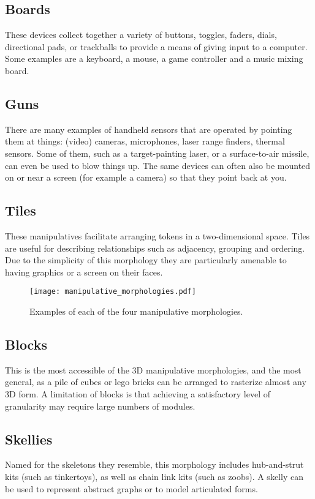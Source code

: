 \subsection{Boards}
%
These devices collect together a variety of buttons, toggles, faders, dials, directional pads, or trackballs to provide a means of giving input to a computer. Some examples are a keyboard, a mouse, a game controller and a music mixing board.

\subsection{Guns}
%
There are many examples of handheld sensors that are operated by pointing them at things: (video) cameras, microphones, laser range finders, thermal sensors. Some of them, such as a target-painting laser, or a surface-to-air missile, can even be used to blow things up. The same devices can often also be mounted on or near a screen (for example a camera) so that they point back at you.

\subsection{Tiles}
%
These manipulatives facilitate arranging tokens in a two-dimensional space. Tiles are useful for describing relationships such as adjacency, grouping and ordering. Due to the simplicity of this morphology they are particularly amenable to having graphics or a screen on their faces. 

\begin{figure}[tbh]
  \centering
    \texttt{[image: manipulative\_morphologies.pdf]}
  \caption{Examples of each of the four manipulative morphologies.}
  \label{fig:manipulative_morphologies}
\end{figure}

\subsection{Blocks}
%
This is the most accessible of the 3D manipulative morphologies, and the most general, as a pile of cubes or lego bricks can be arranged to rasterize almost any 3D form. A limitation of blocks is that achieving a satisfactory level of granularity may require large numbers of modules.

\subsection{Skellies}
%
Named for the skeletons they resemble, this morphology includes hub-and-strut kits (such as tinkertoys), as well as chain link kits (such as zoobs). A skelly can be used to represent abstract graphs or to model articulated forms.

